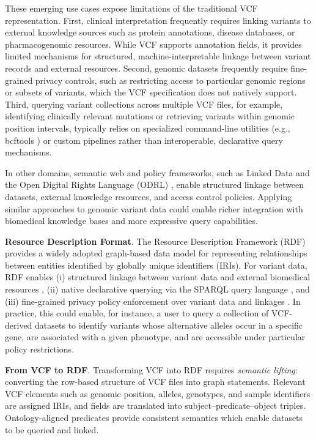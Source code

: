 \documentclass[unnumsec,webpdf,contemporary,large]{oup-authoring-template}
\begin{document}
These emerging use cases expose limitations of the traditional VCF representation.
First, clinical interpretation frequently requires linking variants to external knowledge sources such as protein annotations, disease databases, or pharmacogenomic resources. 
While VCF supports annotation fields, it provides limited mechanisms for structured, machine-interpretable linkage between variant records and external resources. 
Second, genomic datasets frequently require fine-grained privacy controls, such as restricting access to particular genomic regions or subsets of variants, which the VCF specification does not natively support.
Third, querying variant collections across multiple VCF files, for example, identifying clinically relevant mutations or retrieving variants within genomic position intervals, typically relies on specialized command-line utilities (e.g., bcftools \cite{BCFtools}) or custom pipelines rather than interoperable, declarative query mechanisms.

In other domains, semantic web and policy frameworks, such as Linked Data \cite{W3CLinkedDataWiki} and the Open Digital Rights Language (ODRL) \cite{odrl_2018}, enable structured linkage between datasets, external knowledge resources, and access control policies. 
Applying similar approaches to genomic variant data could enable richer integration with biomedical knowledge bases and more expressive query capabilities.


\textbf{Resource Description Format}.
The Resource Description Framework (RDF) \cite{rdf} provides a widely adopted graph-based data model for representing relationships between entities identified by globally unique identifiers (IRIs).
For variant data, RDF enables (i) structured linkage between variant data and external biomedical resources \cite{bio2rdf_2008,openbiolink_2019,sib_2024}, (ii) native declarative querying via the SPARQL query language \cite{sparqllang}, and (iii) fine-grained privacy policy enforcement over variant data and linkages \cite{odrl_2018}.
In practice, this could enable, for instance, a user to query a collection of VCF-derived datasets to identify variants whose alternative alleles occur in a specific gene, are associated with a given phenotype, and are accessible under particular policy restrictions.


\textbf{From VCF to RDF}.
Transforming VCF into RDF requires \textit{semantic lifting}: converting the row-based structure of VCF files into graph statements. 
Relevant VCF elements such as genomic position, alleles, genotypes, and sample identifiers are assigned IRIs, and fields are translated into subject–predicate–object triples. 
Ontology-aligned predicates provide consistent semantics which enable datasets to be queried and linked.
\end{document}
